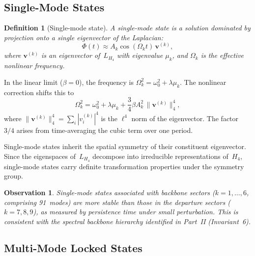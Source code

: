 \documentclass[12pt,a4paper]{article}
\newcommand{\Hfour}{H_4}
\newcommand{\Lmat}{L_{H_4}}
\newtheorem{definition}{Definition}
\newtheorem{observation}{Observation}
\begin{document}
\subsection{Single-Mode States}\label{sec:single}

\begin{definition}[Single-mode state]
A single-mode state is a solution dominated by projection onto a
single eigenvector of the Laplacian:
\begin{equation}\label{eq:single}
  \Phi(t) \approx A_k \cos(\Omega_k t) \, \mathbf{v}^{(k)},
\end{equation}
where $\mathbf{v}^{(k)}$ is an eigenvector of~$\Lmat$ with eigenvalue
$\mu_k$, and $\Omega_k$ is the effective nonlinear frequency.
\end{definition}

In the linear limit ($\beta = 0$), the frequency is
$\Omega_k^2 = \omega_0^2 + \lambda \mu_k$.  The nonlinear correction
shifts this to
\begin{equation}\label{eq:freq_shift_single}
  \Omega_k^2 = \omega_0^2 + \lambda \mu_k
  + \frac{3}{4} \beta A_k^2 \, \lVert \mathbf{v}^{(k)} \rVert_4^4,
\end{equation}
where $\lVert \mathbf{v}^{(k)} \rVert_4^4
= \sum_i |v_i^{(k)}|^4$ is the $\ell^4$ norm of the eigenvector.
The factor~$3/4$ arises from time-averaging the cubic term over one
period.

Single-mode states inherit the spatial symmetry of their constituent
eigenvector.  Since the eigenspaces of~$\Lmat$ decompose into
irreducible representations of~$\Hfour$, single-mode states carry
definite transformation properties under the symmetry group.

\begin{observation}
Single-mode states associated with backbone sectors
($k = 1, \ldots, 6$, comprising 91~modes) are more stable than those
in the departure sectors ($k = 7, 8, 9$), as measured by persistence
time under small perturbation.  This is consistent with the spectral
backbone hierarchy identified in Part~II (Invariant~6).
\end{observation}

\subsection{Multi-Mode Locked States}\label{sec:multi}
\end{document}
